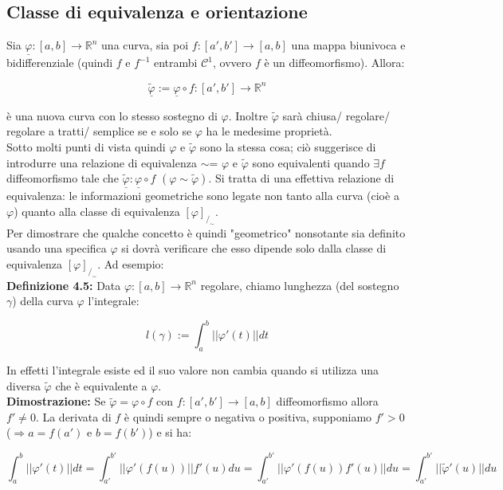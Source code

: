 \documentclass[a4paper,11pt,titlepage]{book}
\begin{document}
\subsection{Classe di equivalenza e orientazione}

Sia $\underline{\varphi}:[a,b]\to\mathbb{R}^n$ una curva, sia poi $f:[a',b']\to[a,b]$ una mappa biunivoca e bidifferenziale (quindi $f$ e $f^{-1}$ entrambi $\mathcal{C}^1$, ovvero $f$ è un diffeomorfismo). Allora:

$$\underline{\tilde{\varphi}}:=\underline{\varphi}\circ f:[a',b']\to\mathbb{R}^n$$

è una nuova curva con lo stesso sostegno di $\varphi$. Inoltre $\tilde{\varphi}$ sarà chiusa/ regolare/ regolare a tratti/ semplice se e solo se $\varphi$ ha le medesime proprietà.\\

Sotto molti punti di vista quindi $\varphi$ e $\tilde{\varphi}$ sono la stessa cosa; ciò suggerisce di introdurre una relazione di equivalenza $\sim$= $\varphi$ e $\tilde{\varphi}$ sono equivalenti quando $\exists f$ diffeomorfismo tale che $\underline{\tilde{\varphi}}:\underline{\varphi}\circ f$ $(\varphi\sim\tilde{\varphi})$. Si tratta di una effettiva relazione di equivalenza: le informazioni geometriche sono legate non tanto alla curva (cioè a $\varphi$) quanto alla classe di equivalenza $[\varphi]_{/_\sim}$.\\

Per dimostrare che qualche concetto è quindi "geometrico" nonsotante sia definito usando una specifica $\varphi$ si dovrà verificare che esso dipende solo dalla classe di equivalenza $[\varphi]_{/_\sim}$. Ad esempio:\\

\textbf{Definizione 4.5: }Data $\varphi:[a,b]\to\mathbb{R}^n$ regolare, chiamo lunghezza (del sostegno $\gamma$) della curva $\varphi$ l'integrale:

$$l(\gamma):=\int_a^b||\varphi'(t)||dt$$

In effetti l'integrale esiste ed il suo valore non cambia quando si utilizza una diversa $\tilde{\varphi}$ che è equivalente a $\varphi$.\\

\textbf{Dimostrazione: } Se $\tilde{\varphi}=\varphi\circ f$ con $f:[a',b']\to[a,b]$ diffeomorfismo allora $f'\ne 0$. La derivata di $f$ è quindi sempre o negativa o positiva, supponiamo $f'>0$ ($\Rightarrow a=f(a')$ e $b=f(b')$) e si ha:

$$\int_a^b||\varphi'(t)||dt=\int_{a'}^{b'} ||\varphi'(f(u))||f'(u)du=\int_{a'}^{b'} ||\varphi'(f(u))f'(u)||du=\int_{a'}^{b'}||\tilde{\varphi}'(u)||du$$
\end{document}
